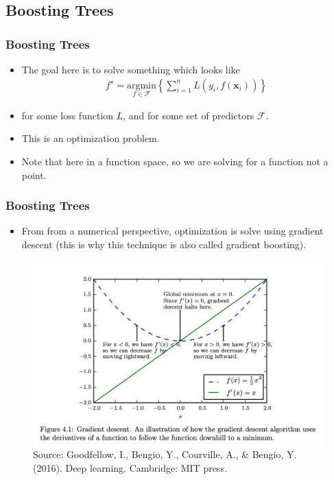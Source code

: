 \documentclass[
  shownotes,
  xcolor={svgnames},
  hyperref={colorlinks,citecolor=DarkBlue,linkcolor=DarkRed,urlcolor=DarkBlue}
  , aspectratio=169]{beamer}
\begin{document}
\subsection{Boosting Trees}
\begin{frame}[fragile]
\frametitle{Boosting Trees}

\begin{itemize}


\item The goal here is to solve something which looks like
\begin{align}
f^\star=\underset{f\in\mathcal{F}}{\text{argmin}}\left\lbrace \sum_{i=1}^n L(y_i,f(\mathbf{x}_i)) \right\rbrace
\end{align}


\item for some loss function $L$, and for some set of predictors $\mathcal{F}$. 
\medskip
\item This is an optimization problem. 
\medskip
\item Note that here in a function space, so we are solving for a function not a point.
\end{itemize}


\end{frame}
\begin{frame}[fragile]
\frametitle{Boosting Trees}

\begin{itemize}
\item From from a numerical perspective, optimization is solve using gradient descent (this is why this technique is also called gradient boosting). 
\end{itemize}

\begin{figure}[H] \centering
            \captionsetup{justification=centering}
              \includegraphics[scale=0.3]{figures/gradient_descent}
              \\
              \tiny
              Source: Goodfellow, I., Bengio, Y., Courville, A., \& Bengio, Y. (2016). Deep learning. Cambridge: MIT press.
 \end{figure}


\end{frame}
\end{document}
